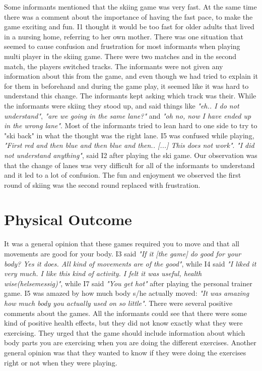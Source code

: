 Some informants mentioned that the skiing game was very fast. At the same time there was a comment about the importance of having the fast pace, to make the game exciting and fun. I1 thought it would be too fast for older adults that lived in a nursing home, referring to her own mother. There was one situation that seemed to cause confusion and frustration for most informants when playing multi player in the skiing game. There were two matches and in the second match, the players switched tracks. The informants were not given any information about this from the game, and even though we had tried to explain it for them in beforehand and during the game play, it seemed like it was hard to understand this change. The informants kept asking which track was their. While the informants were skiing they stood up, and said things like \emph{"eh.. I do not understand"}, \emph{"are we going in the same lane?"} and \emph{"oh no, now I have ended up in the wrong lane"}. Most of the informants tried to lean hard to one side to try to "ski back" in what the thought was the right lane. I5 was confused while playing, \emph{"First red and then blue and then blue and then.. [...] This does not work"}. \emph{"I did not understand anything"}, said I2 after playing the ski game. Our observation was that the change of lanes was very difficult for all of the informants to understand and it led to a lot of confusion. The fun and enjoyment we observed the first round of skiing was the second round replaced with frustration. 

\section{Physical Outcome}

It was a general opinion that these games required you to move and that all movements are good for your body. I3 said \emph{"If it [the game] do good for your body? Yes it does. All kind of movements are of the good"}, while I4 said  \emph{"I liked it very much. I like this kind of activity. I felt it was useful, health wise(helsemessig)"}, while I7 said \emph{"You get hot"} after playing the personal trainer game. I5 was amazed by how much body s/he actually moved: \emph{"It was amazing how much body you actually used on so little"}. There were several positive comments about the games. All the informants could see that there were some kind of positive health effects, but they did not know exactly what they were exercising. They urged that the game should include information about which body parts you are exercising when you are doing the different exercises. Another general opinion was that they wanted to know if they were doing the exercises right or not when they were playing. 


